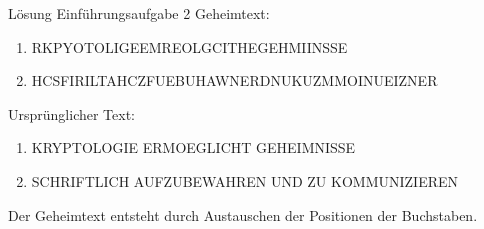 \begin{frame}[label=intro2Sol]{Lösung Einführungsaufgabe 2}
    Geheimtext:
    \begin{center}
        \small
        \begin{enumerate}
            \item RKPYOTOLIGEEMREOLGCITHEGEHMIINSSE
            \item HCSFIRILTAHCZFUEBUHAWNERDNUKUZMMOINUEIZNER
        \end{enumerate}
        \normalsize
    \end{center}
    Ursprünglicher Text:
    \begin{center}
        \small
        \begin{enumerate}
            \item KRYPTOLOGIE ERMOEGLICHT GEHEIMNISSE
            \item SCHRIFTLICH AUFZUBEWAHREN UND ZU KOMMUNIZIEREN
        \end{enumerate}
        \normalsize
    \end{center}
    Der Geheimtext entsteht durch Austauschen der Positionen der Buchstaben.
    \begin{figure}[H]
        \centering
        \begin{subfigure}[b]{0.45\textwidth}
\end{subfigure}
\end{figure}
\end{frame}
